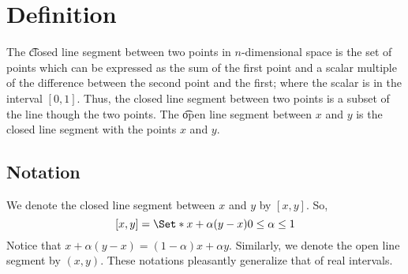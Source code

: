 
\section*{Definition}

The \t{closed line segment between} two points in $n$-dimensional space is the set of points which can be expressed as the sum of the first point and a scalar multiple of the difference between the second point and the first; where the scalar is in the interval $[0, 1]$.
Thus, the closed line segment between two points is a subset of the line though the two points.
The \t{open line segment} between $x$ and $y$ is the closed line segment with the points $x$ and $y$.

\subsection*{Notation}

We denote the closed line segment between $x$ and $y$ by $[x, y]$.
So,
\[
[x,y] = \Set*{x + \alpha (y-x)}{0 \leq \alpha  \leq 1}
\]
Notice that $x + \alpha (y - x) = (1-\alpha )x + \alpha y$.
Similarly, we denote the open line segment by $(x, y)$.
These notations pleasantly generalize that of real intervals.

\blankpage